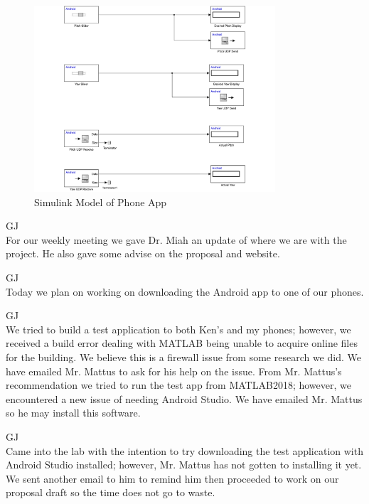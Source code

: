 \documentclass[fontsize=11pt, %
                             paper=letter, %
                             openany, %
                             captions=tableheading,
                             index=totoc,
                             hyperref]{labbook}
\begin{document}
\begin{addmargin}[0cm]{0cm}
\begin{figure}[h]
  \centering
  \includegraphics[width=0.8\textwidth]{figs/img/Android_Interface}
  \caption{Simulink Model of Phone App}
  \label{fig:Android_Interface}
\end{figure}

GJ\\
For our weekly meeting we gave Dr. Miah an update of where we are with the project.  He also gave some advise on the proposal and website.

GJ\\
Today we plan on working on downloading the Android app to one of our phones.

GJ\\
We tried to build a test application to both Ken's and my phones; however, we received a build error dealing with MATLAB being unable to acquire online files for the building.  We believe this is a firewall issue from some research we did.  We have emailed Mr. Mattus to ask for his help on the issue.  From Mr. Mattus's recommendation we tried to run the test app from MATLAB2018; however, we encountered a new issue of needing Android Studio.  We have emailed Mr. Mattus so he may install this software.

GJ\\
Came into the lab with the intention to try downloading the test application with Android Studio installed; however, Mr. Mattus has not gotten to installing it yet.  We sent another email to him to remind him then proceeded to work on our proposal draft so the time does not go to waste.


\end{addmargin}
\end{document}
